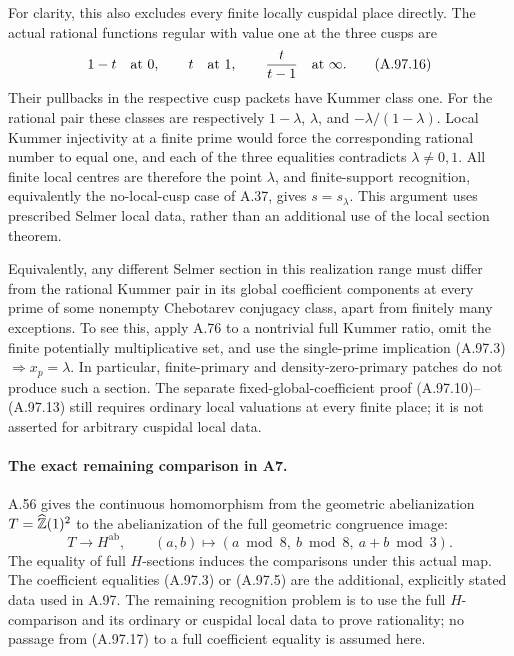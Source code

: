 For clarity, this also excludes every finite locally
cuspidal place directly.  The actual rational functions
regular with value one at the three cusps are
\[
       1-t\quad\hbox{at }0,\qquad
       t\quad\hbox{at }1,\qquad
       \frac{t}{t-1}\quad\hbox{at }\infty.
\tag{A.97.16}
\]
Their pullbacks in the respective cusp packets have
Kummer class one.  For the rational pair these classes
are respectively $1-\lambda$, $\lambda$, and
$-\lambda/(1-\lambda)$.  Local Kummer injectivity at
a finite prime would force the corresponding rational
number to equal one, and each of the three equalities
contradicts $\lambda\ne0,1$.
All finite local centres are therefore the point
$\lambda$, and finite-support recognition, equivalently
the no-local-cusp case of A.37, gives $s=s_\lambda$.
This argument uses prescribed Selmer local data, rather
than an additional use of the local section theorem.

Equivalently, any different Selmer section in this
realization range must differ from the rational Kummer
pair in its global coefficient components at every prime
of some nonempty Chebotarev conjugacy class, apart from
finitely many exceptions.  To see this, apply A.76 to a
nontrivial full Kummer ratio, omit the finite potentially
multiplicative set, and use the single-prime implication
(A.97.3)$\Rightarrow x_p=\lambda$.
In particular, finite-primary and density-zero-primary
patches do not produce such a section.
The separate fixed-global-coefficient proof
(A.97.10)--(A.97.13) still requires ordinary local
valuations at every finite place; it is not asserted for
arbitrary cuspidal local data.

\paragraph{The exact remaining comparison in A7.}
A.56 gives the continuous homomorphism from the geometric
abelianization $T=\widehat{\mathbb Z}(1)^2$ to the abelianization
of the full geometric congruence image:
\[
        T\longrightarrow H^{\mathrm{ab}},\qquad
         (a,b)\longmapsto
              (a\bmod8,\ b\bmod8,\ a+b\bmod3).
\tag{A.97.17}
\]
The equality of full $H$-sections induces the comparisons
under this actual map.  The coefficient equalities
(A.97.3) or (A.97.5) are the additional, explicitly
stated data used in A.97.  The remaining recognition
problem is to use the full $H$-comparison and its
ordinary or cuspidal local data to prove rationality;
no passage from (A.97.17) to a full coefficient equality
is assumed here.
